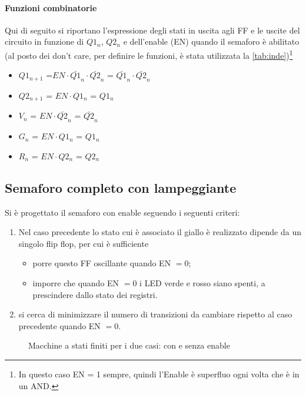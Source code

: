 \documentclass[a4paper,10pt]{article}
\begin{document}
\paragraph{Funzioni combinatorie}
Qui di seguito si riportano l'espressione degli stati in uscita agli FF e le uscite del circuito in funzione di $Q1_n$, $Q2_n$ e dell'enable (EN) quando il semaforo è abilitato (al posto dei don't care, per definire le funzioni, è stata utilizzata la \cref{tab:inde})\footnote{In questo caso EN = 1 sempre, quindi l'Enable è superfluo ogni volta che è in un AND.}
\begin{itemize}
\item $Q1_{n+1}$ =$ EN \cdot \bar{Q1}_n \cdot \bar{Q2}_n $ = $\bar{Q1}_n \cdot \bar{Q2}_n $
\item $Q2_{n+1}$ = $EN \cdot Q1_n$ = $Q1_n$ 
\item $V_{n}$ = $EN \cdot \bar{Q2}_n$ = $\bar{Q2}_n$
\item $G_{n}$ = $ EN \cdot Q1_n$ = $Q1_n$ 
\item $R_{n}$ = $EN \cdot Q2_n$ = $Q2_n$ 
\end{itemize}


\subsection{Semaforo completo con lampeggiante}

Si è progettato il semaforo con enable seguendo i seguenti criteri:
\begin{enumerate}
	\item Nel caso precedente lo stato cui è associato il giallo è realizzato dipende da un singolo flip flop, per cui è sufficiente
	\begin{itemize}
		\item porre questo FF oscillante quando EN $ = 0 $;
		\item imporre che quando  EN $ = 0 $ i LED verde e rosso siano spenti, a prescindere dallo stato dei registri.
	\end{itemize}
	\item si cerca di minimizzare il numero di transizioni da cambiare rispetto al caso precedente quando EN $ = 0 $.
\end{enumerate}

\begin{figure}[H]
	\centering
	
	\caption{Macchine a stati finiti per i due casi: con e senza enable}
	\label{fig:EN}
\end{figure}
\end{document}

